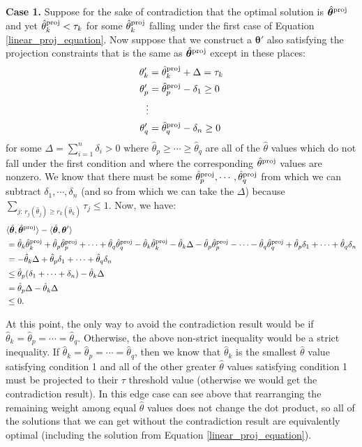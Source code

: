 \documentclass{article} %
\newcommand{\bmthproj}{\hat{\bm{\theta}}^{\textnormal{proj}}}
\newcommand{\thproj}{\hat{\theta}^{\textnormal{proj}}}
\begin{document}
\textbf{Case 1.}
Suppose for the sake of contradiction that the optimal solution is $\bmthproj$ and yet $\thproj_k < \tau_k$ for some $\thproj_k$ falling under the first case of Equation \ref{linear_proj_equation}. Now suppose that we construct a $\bm{\theta}'$ also satisfying the projection constraints that is the same as $\bmthproj$ except in these places:
\begin{align*}
\theta'_k &= \thproj_k + \Delta = \tau_k\\
\theta'_p &= \thproj_p - \delta_1 \geq 0\\
\vdots\\
\theta'_q &= \thproj_q - \delta_n \geq 0\\
\end{align*}
for some $\Delta=\sum_{i=1}^n \delta_i >0$ where $\hat{\theta}_p \geq \cdots \geq \hat{\theta}_q$ are all of the $\hat{\theta}$ values which do not fall under the first condition and where the corresponding $\thproj$ values are nonzero. We know that there must be some $\thproj_p, \cdots, \thproj_q$ from which we can subtract $\delta_1, \cdots, \delta_n$ (and so from which we can take the $\Delta$) because $\sum_{j\text{: }r_j(\hat{\theta}_j) \geq r_k(\hat{\theta}_k)} \tau_j \leq 1$. Now, we have:
\begin{align*}
&\langle \hat{\bm{\theta}}, \bmthproj \rangle - \langle \hat{\bm{\theta}}, \bm{\theta}' \rangle\\
&= \hat{\theta}_k\thproj_k + \hat{\theta}_p\thproj_p + \cdots + \hat{\theta}_q\thproj_q - \hat{\theta}_k\thproj_k - \hat{\theta}_k\Delta -\hat{\theta}_p\thproj_p - \cdots - \hat{\theta}_q\thproj_q + \hat{\theta}_p\delta_1 + \cdots + \hat{\theta}_q\delta_n\\
&= -\hat{\theta}_k\Delta + \hat{\theta}_p\delta_1 + \cdots + \hat{\theta}_q\delta_n\\
&\leq \hat{\theta}_p(\delta_1+\cdots+\delta_n) - \hat{\theta}_k\Delta\\
&=\hat{\theta}_p\Delta - \hat{\theta}_k\Delta\\
&\leq 0.
\end{align*}

At this point, the only way to avoid the contradiction result would be if $\hat{\theta}_k=\hat{\theta}_p=\cdots=\hat{\theta}_q$. Otherwise, the above non-strict inequality would be a strict inequality. If $\hat{\theta}_k=\hat{\theta}_p=\cdots=\hat{\theta}_q$, then we know that $\hat{\theta}_k$ is the smallest $\hat{\theta}$ value satisfying condition 1 and all of the other greater $\hat{\theta}$ values satisfying condition 1 must be projected to their $\tau$ threshold value (otherwise we would get the contradiction result). In this edge case can see above that rearranging the remaining weight among equal $\hat{\theta}$ values does not change the dot product, so all of the solutions that we can get without the contradiction result are equivalently optimal (including the solution from Equation \ref{linear_proj_equation}).
\end{document}
